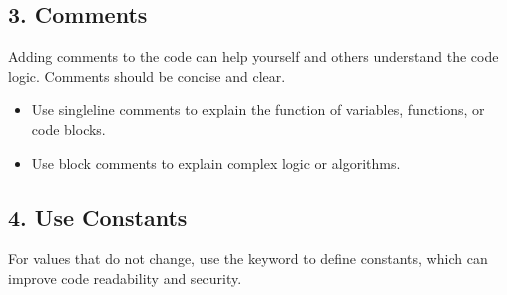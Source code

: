 \documentclass[a4paper,11pt,english]{sphinxmanual}
\begin{document}
\subsection{3. Comments}
\label{\detokenize{Get_Started_with_Arduino/Sketch_Writing_Rules:comments}}
\sphinxAtStartPar
Adding comments to the code can help yourself and others understand the code logic. Comments should be concise and clear.
\begin{itemize}
\item {} 
\sphinxAtStartPar
Use single\sphinxhyphen{}line comments to explain the function of variables, functions, or code blocks.

\begin{sphinxVerbatim}[commandchars=\\\{\}]
\end{sphinxVerbatim}

\item {} 
\sphinxAtStartPar
Use block comments to explain complex logic or algorithms.

\begin{sphinxVerbatim}[commandchars=\\\{\}]
\end{sphinxVerbatim}

\end{itemize}


\subsection{4. Use Constants}
\label{\detokenize{Get_Started_with_Arduino/Sketch_Writing_Rules:use-constants}}
\sphinxAtStartPar
For values that do not change, use the  keyword to define constants, which can improve code readability and security.

\begin{sphinxVerbatim}[commandchars=\\\{\}]
\end{sphinxVerbatim}
\end{document}
